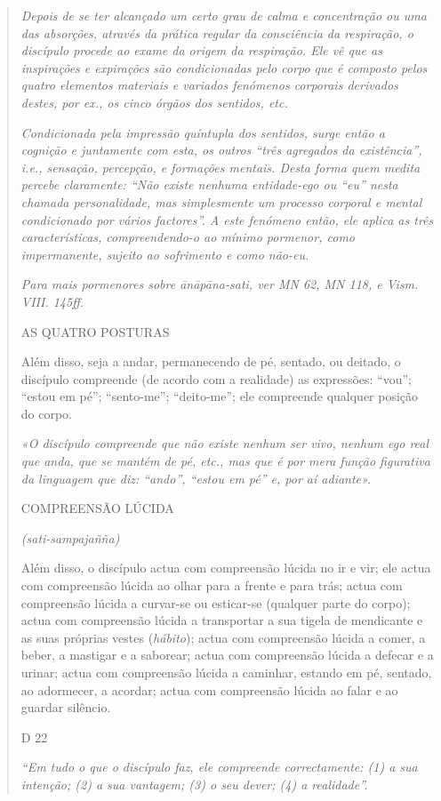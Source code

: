 \begin{quote}
\emph{Depois de se ter alcançado um certo grau de calma e concentração ou uma das absorções, através da prática regular da consciência da respiração, o discípulo procede ao exame da origem da respiração. Ele vê que as inspirações e expirações são condicionadas pelo corpo que é composto pelos quatro elementos materiais e variados fenómenos corporais derivados destes, por ex., os cinco órgãos dos sentidos, etc.}

\emph{Condicionada pela impressão quíntupla dos sentidos, surge então a cognição e juntamente com esta, os outros ``três agregados da existência'', i.e., sensação, percepção, e formações mentais. Desta forma quem medita percebe claramente: ``Não existe nenhuma entidade-ego ou ``eu'' nesta chamada personalidade, mas simplesmente um processo corporal e mental condicionado por vários factores''. A este fenómeno então, ele aplica as três características, compreendendo-o ao mínimo pormenor, como impermanente, sujeito ao sofrimento e como não-eu.}

\emph{Para mais pormenores sobre ānāpāna-sati, ver MN 62, MN 118, e Vism. VIII. 145ff.}

AS QUATRO POSTURAS

Além disso, seja a andar, permanecendo de pé, sentado, ou deitado, o discípulo compreende (de acordo com a realidade) as expressões: ``vou''; ``estou em pé''; ``sento-me''; ``deito-me''; ele compreende qualquer posição do corpo.

\emph{«O discípulo compreende que não existe nenhum ser vivo, nenhum ego real que anda, que se mantém de pé, etc., mas que é por mera função figurativa da linguagem que diz: ``ando'', ``estou em pé'' e, por aí adiante».}

COMPREENSÃO LÚCIDA

\emph{(sati-sampajañña)}

Além disso, o discípulo actua com compreensão lúcida no ir e vir; ele actua com compreensão lúcida ao olhar para a frente e para trás; actua com compreensão lúcida a curvar-se ou esticar-se (qualquer parte do corpo); actua com compreensão lúcida a transportar a sua tigela de mendicante e as suas próprias vestes (\emph{hábito}); actua com compreensão lúcida a comer, a beber, a mastigar e a saborear; actua com compreensão lúcida a defecar e a urinar; actua com compreensão lúcida a caminhar, estando em pé, sentado, ao adormecer, a acordar; actua com compreensão lúcida ao falar e ao guardar silêncio.

D 22

\emph{``Em tudo o que o discípulo faz, ele compreende correctamente: (1) a sua intenção; (2) a sua vantagem; (3) o seu dever; (4) a realidade''.}


\end{quote}
